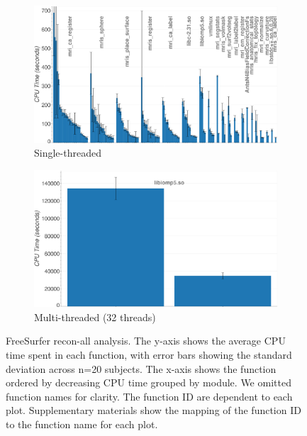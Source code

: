 \documentclass[conference]{IEEEtran}
\begin{document}
\begin{figure}
	\centering
	\begin{subfigure}[t]{0.49\textwidth}
		\caption{Single-threaded}
		\label{subfig:hotspots-freesurfer-reconall-1thread}
		\includegraphics[width=\textwidth]{figures/hotspots-1threads-freesurfer-reconall-simple.png}
	\end{subfigure}
	\begin{subfigure}[t]{0.49\textwidth}
		\caption{Multi-threaded (32 threads)}
		\label{subfig:hotspots-freesurfer-reconall-32threads}
		\includegraphics[width=\textwidth]{figures/hotspots-32threads-freesurfer-reconall-simple.png}
	\end{subfigure}
	\caption{FreeSurfer recon-all analysis. The y-axis shows the average CPU time spent in each function, with error bars showing the standard deviation across n=20 subjects. The x-axis shows the function ordered by decreasing CPU time grouped by module. We omitted function names for clarity. The function ID are dependent to each plot. Supplementary materials show the mapping of the function ID to the function name for each plot.}
	\label{fig:hotspots-freesurfer-reconall}
\end{figure}
			
\end{document}

